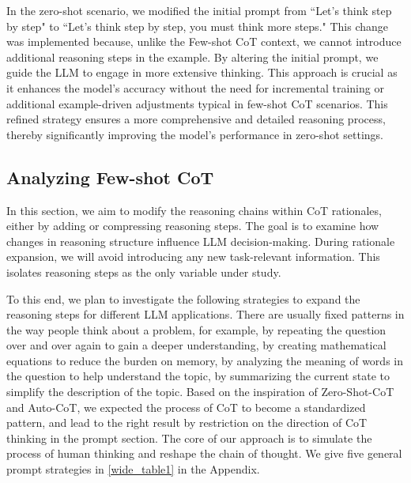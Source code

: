 \documentclass[11pt]{article}
\begin{document}
In the zero-shot scenario, we modified the initial prompt from ``Let's think step by step" to ``Let's think step by step, you must think more steps." This change was implemented because, unlike the Few-shot CoT context, we cannot introduce additional reasoning steps in the example. By altering the initial prompt, we guide the LLM to engage in more extensive thinking. This approach is crucial as it enhances the model's accuracy without the need for incremental training or additional example-driven adjustments typical in few-shot CoT scenarios. This refined strategy ensures a more comprehensive and detailed reasoning process, thereby significantly improving the model's performance in zero-shot settings.



\subsection{Analyzing Few-shot CoT}
In this section, we aim to modify the reasoning chains within CoT rationales, either by adding or compressing reasoning steps. The goal is to examine how changes in reasoning structure influence LLM decision-making. During rationale expansion, we will avoid introducing any new task-relevant information. This isolates reasoning steps as the only variable under study.

To this end, we plan to investigate the following strategies to expand the reasoning steps for different LLM applications.
There are usually fixed patterns in the way people think about a problem, for example, by repeating the question over and over again to gain a deeper understanding, by creating mathematical equations to reduce the burden on memory, by analyzing the meaning of words in the question to help understand the topic, by summarizing the current state to simplify the description of the topic. 
Based on the inspiration of Zero-Shot-CoT and Auto-CoT, we expected the process of CoT to become a standardized pattern, and lead to the right result by restriction on the direction of CoT thinking in the prompt section.
The core of our approach is to simulate the process of human thinking and reshape the chain of thought. We give five general prompt strategies in \autoref{wide_table1} in the Appendix.
\end{document}
